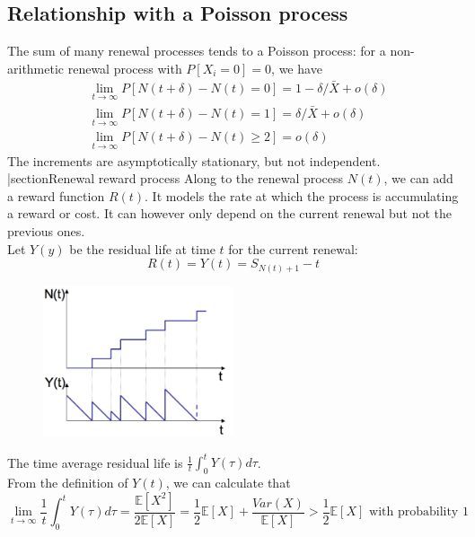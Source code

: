 \documentclass[12pt, openany]{report}
\newcommand{\E}{\mathbb{E}}
\theoremstyle{definition}
\begin{document}
\subsection{Relationship with a Poisson process}
The sum of many renewal processes tends to a Poisson process: for a non-arithmetic renewal process with $P[X_i=0]=0$, we have 
\begin{equation}
  \begin{aligned}
    &\lim_{t\to\infty} P[N(t+\delta)-N(t)=0]=1-\delta/\bar X + o(\delta)\\
    &\lim_{t\to\infty} P[N(t+\delta)-N(t)=1]=\delta/\bar X + o(\delta)\\
	&\lim_{t\to\infty} P[N(t+\delta)-N(t)\ge 2]=o(\delta)
  \end{aligned}
\end{equation}
The increments are asymptotically stationary, but not independent. 
|section{Renewal reward process}
Along to the renewal process $N(t)$, we can add a reward function $R(t)$. It models the rate at which the process is accumulating a reward or cost. It can however only depend on the current renewal but not the previous ones. \\
Let $Y(y)$ be the residual life at time $t$ for the current renewal:
\begin{equation}
	R(t)=Y(t)=S_{N(t)+1}-t
\end{equation}
\begin{figure}[H]
	\centering
	\includegraphics[width=0.5\textwidth]{img/reward.png}
\end{figure}
The time average residual life is $\frac{1}{t}\int_0^t Y(\tau)d\tau$.\\
From the definition of $Y(t)$, we can calculate that 
\begin{equation}
	\lim_{t\to \infty} \frac{1}{t}\int_0^t Y(\tau)d\tau = \frac{\E[X^2]}{2\E[X]} = \frac{1}{2}\E[X] + \frac{Var(X)}{\E[X]} > \frac{1}{2}\E[X]\text{ with probability 1}
\end{equation}
\end{document}
